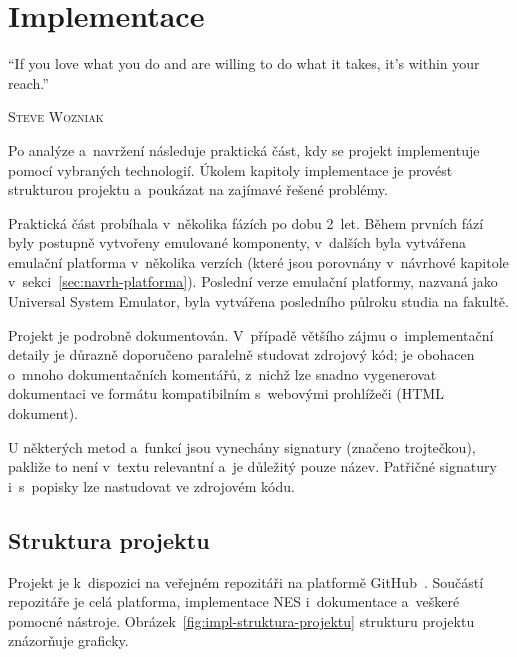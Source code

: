 \chapter{Implementace}
\epigraph{
	\enquote{If you love what you do and are willing to do what it takes, it's within your reach.}
}{\textsc{Steve Wozniak}}

Po analýze a~navržení následuje praktická část, kdy se projekt implementuje pomocí vybraných technologií. 
Úkolem kapitoly implementace je provést strukturou projektu a~poukázat na zajímavé řešené problémy.

Praktická část probíhala v~několika fázích po dobu 2~let. Během prvních fází byly postupně vytvořeny emulované komponenty, v~dalších byla vytvářena emulační platforma v~několika verzích (které jsou porovnány v~návrhové kapitole v~sekci~\ref{sec:navrh-platforma}). Poslední verze emulační platformy, nazvaná jako Universal System Emulator, byla vytvářena posledního půlroku studia na fakultě.

Projekt je podrobně dokumentován. V~případě většího zájmu o~implementační detaily je důrazně doporučeno paralelně studovat zdrojový kód; je obohacen o~mnoho dokumentačních komentářů, z~nichž lze snadno vygenerovat dokumentaci ve formátu kompatibilním s~webovými prohlížeči (HTML dokument).

\begin{note}
	U některých metod a~funkcí jsou vynechány signatury (značeno trojtečkou), pakliže to není v~textu relevantní a~je důležitý pouze název. Patřičné signatury i~s~popisky lze nastudovat ve zdrojovém kódu.
\end{note}

\section{Struktura projektu}
Projekt je k~dispozici na veřejném repozitáři na platformě GitHub~\cite{Golasowski2023:use}. Součástí repozitáře je celá platforma, implementace NES i~dokumentace a~veškeré pomocné nástroje. Obrázek~\ref{fig:impl-struktura-projektu} strukturu projektu znázorňuje graficky.

